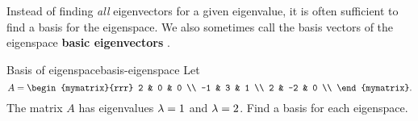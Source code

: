 Instead of finding {\em all} eigenvectors for a given eigenvalue, it
is often sufficient to find a basis for the eigenspace. We also
sometimes call the basis vectors of the eigenspace \textbf{basic
  eigenvectors}%
%
%
.

\begin{example}{Basis of eigenspace}{basis-eigenspace}
  Let
  \begin{equation*}
    A = \begin{mymatrix}{rrr}
      2  &  0 & 0 \\
      -1 &  3 & 1 \\
      2  & -2 & 0 \\
    \end{mymatrix}.
  \end{equation*}
  The matrix $A$ has eigenvalues $\lambda=1$ and $\lambda=2$. Find a
  basis for each eigenspace.
\end{example}

